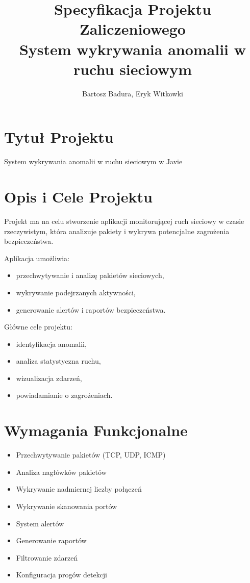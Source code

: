 \documentclass[a4paper,12pt]{article}
\title{Specyfikacja Projektu Zaliczeniowego \\ \large System wykrywania anomalii w ruchu sieciowym }
\author{Bartosz Badura, Eryk Witkowki}
\begin{document}
	
	\maketitle
	
	\section{Tytuł Projektu}
	System wykrywania anomalii w ruchu sieciowym  w Javie
	
	\section{Opis i Cele Projektu}
	Projekt ma na celu stworzenie aplikacji monitorującej ruch sieciowy w czasie rzeczywistym, która analizuje pakiety i wykrywa potencjalne zagrożenia bezpieczeństwa.
	
	Aplikacja umożliwia:
	\begin{itemize}
		\item przechwytywanie i analizę pakietów sieciowych,
		\item wykrywanie podejrzanych aktywności,
		\item generowanie alertów i raportów bezpieczeństwa.
	\end{itemize}
	
	Główne cele projektu:
	\begin{itemize}
		\item identyfikacja anomalii,
		\item analiza statystyczna ruchu,
		\item wizualizacja zdarzeń,
		\item powiadamianie o zagrożeniach.
	\end{itemize}
	
	\section{Wymagania Funkcjonalne}
	\begin{itemize}
		\item Przechwytywanie pakietów (TCP, UDP, ICMP)
		\item Analiza nagłówków pakietów
		\item Wykrywanie nadmiernej liczby połączeń
		\item Wykrywanie skanowania portów
		\item System alertów
		\item Generowanie raportów
		\item Filtrowanie zdarzeń
		\item Konfiguracja progów detekcji
	\end{itemize}
	
\end{document}
